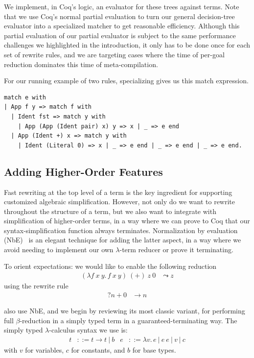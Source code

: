 We implement, in Coq's logic, an evaluator for these trees against terms.
Note that we use Coq's normal partial evaluation to turn our general decision-tree evaluator into a specialized matcher to get reasonable efficiency.
Although this partial evaluation of our partial evaluator is subject to the same performance challenges we highlighted in the introduction, it only has to be done once for each set of rewrite rules, and we are targeting cases where the time of per-goal reduction dominates this time of meta-compilation.

For our running example of two rules, specializing gives us this match expression.
\begin{verbatim}
match e with
| App f y => match f with
  | Ident fst => match y with
    | App (App (Ident pair) x) y => x | _ => e end
  | App (Ident +) x => match y with
    | Ident (Literal 0) => x | _ => e end | _ => e end | _ => e end.
\end{verbatim}

\subsection{Adding Higher-Order Features} \label{sec:thunk-eval-subst-term}

Fast rewriting at the top level of a term is the key ingredient for supporting customized algebraic simplification.
However, not only do we want to rewrite throughout the structure of a term, but we also want to integrate with simplification of higher-order terms, in a way where we can prove to Coq that our syntax-simplification function always terminates.
Normalization by evaluation (NbE)~\cite{NbE} is an elegant technique for adding the latter aspect, in a way where we avoid needing to implement our own $\lambda$-term reducer or prove it terminating.

To orient expectations: we would like to enable the following reduction
\begin{align*}
  (\lambda f\ x\ y.\, f\ x\ y)\ (+)\ z\ 0 & \leadsto z
\end{align*}
\noindent using the rewrite rule
\begin{align*}
  ?n + 0 & \to n
\end{align*}

\textcite{Aehlig} also use NbE, and we begin by reviewing its most classic variant, for performing full $\beta$-reduction in a simply typed term in a guaranteed-terminating way.
The simply typed $\lambda$-calculus syntax we use is:
\begin{align*}
  t & ::= t \to t ~|~ b
  & e & ::= \lambda v.\, e ~|~ e~e ~|~ v ~|~ c
\end{align*}
\noindent with $v$ for variables, $c$ for constants, and $b$ for base types.


